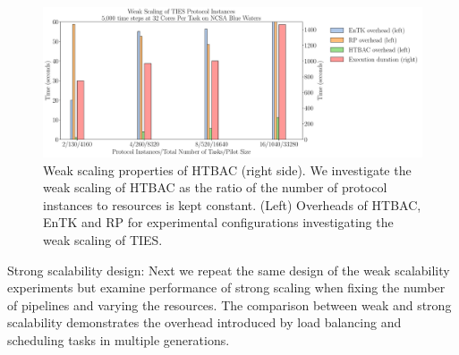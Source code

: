 \begin{figure}
  \centering
   \includegraphics[width=\columnwidth]{figures/weak_scaling_TIES_instances_5,000_timesteps}
  \caption{Weak scaling properties of HTBAC (right side). We investigate the
  weak scaling of HTBAC as the ratio of the number of protocol instances to
  resources is kept constant. (Left) Overheads of HTBAC, EnTK and RP for
  experimental configurations investigating the weak scaling of TIES.
  }
\label{fig:weak_scaling}
\end{figure}



Strong scalability design: Next we repeat the same design of the weak scalability experiments but examine performance of strong scaling when fixing the number of pipelines and varying the resources. The comparison between weak and strong scalability demonstrates the overhead introduced by load balancing and scheduling tasks in multiple generations.



